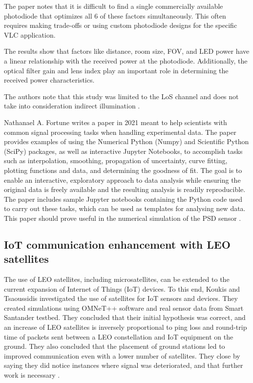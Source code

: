 The paper notes that it is difficult to find a single commercially available photodiode that optimizes all 6 of these factors simultaneously. This often requires making trade-offs or using custom photodiode designs for the specific VLC application.

The results show that factors like distance, room size, FOV, and LED power have a linear relationship with the received power at the photodiode. Additionally, the optical filter gain and lens index play an important role in determining the received power characteristics.

The authors note that this study was limited to the LoS channel and does not take into consideration indirect illumination \cite{Fueda2017}.

Nathanael A. Fortune writes a paper in 2021 meant to help scientists with common signal processing tasks when handling experimental data. The paper provides examples of using the Numerical Python (Numpy) and Scientific Python (SciPy) packages, as well as interactive Jupyter Notebooks, to accomplish tasks such as interpolation, smoothing, propagation of uncertainty, curve fitting, plotting functions and data, and determining the goodness of fit. The goal is to enable an interactive, exploratory approach to data analysis while ensuring the original data is freely available and the resulting analysis is readily reproducible. The paper includes sample Jupyter notebooks containing the Python code used to carry out these tasks, which can be used as templates for analysing new data. This paper should prove useful in the numerical simulation of the PSD sensor \cite{Fortune2021}.

\subsection{IoT communication enhancement with LEO satellites}
The use of LEO satellites, including microsatellites, can be extended to the current expansion of Internet of Things (IoT) devices. To this end, Koukis and Tsaoussidis investigated the use of satellites for IoT sensors and devices. They created simulations using OMNeT++ software and real sensor data from Smart Santander testbed. They concluded that their initial hypothesis was correct, and an increase of LEO satellites is inversely proportional to ping loss and round-trip time of packets sent between a LEO constellation and IoT equipment on the ground. They also concluded that the placement of ground stations led to improved communication even with a lower number of satellites. They close by saying they did notice instances where signal was deteriorated, and that further work is necessary \cite{Koukis2023}.

